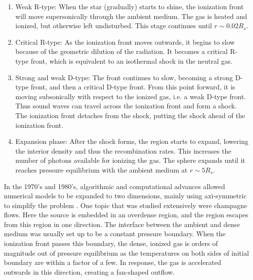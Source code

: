 \documentclass[useAMS,usenatbib]{mn2e}
\begin{document}
\begin{enumerate}
\item Weak R-type:  When the star (gradually) starts to shine, the
  ionization front will move supersonically through the ambient
  medium.  The gas is heated and ionized, but otherwise left
  undisturbed.  This stage continues until $r \sim 0.02R_s$.
\item Critical R-type:  As the ionization front moves outwards, it
  begins to slow because of the geometric dilution of the radiation.
  It becomes a critical R-type front, which is equivalent to an
  isothermal shock in the neutral gas.
\item Strong and weak D-type:  The front continues to slow, becoming a
  strong D-type front, and then a critical D-type front.  From this
  point forward, it is moving subsonically with respect to the ionized
  gas, i.e. a weak D-type front.  Thus sound waves can travel across
  the ionization front and form a shock.  The ionization front
  detaches from the shock, putting the shock ahead of the ionization
  front.
\item Expansion phase:  After the shock forms, the \hii region
  starts to expand, lowering the interior density and thus the
  recombination rates.  This increases the number of photons available
  for ionizing the gas.  The sphere expands until it reaches pressure
  equilibrium with the ambient medium at $r \sim 5R_s$.
\end{enumerate}
%

In the 1970's and 1980's, algorithmic and computational advances
allowed numerical models to be expanded to two dimensions, mainly
using axi-symmetric to simplify the problem
\citep[e.g.][]{Bodenheimer79, Sandford82, Yorke83}.  One topic that was
studied extensively were champagne flows.  Here the source is embedded
in an overdense region, and the \hii region escapes from this
region in one direction.  The interface between the ambient and dense
medium was usually set up to be a constant pressure boundary.  When
the ionization front passes this boundary, the dense, ionized gas is
orders of magnitude out of pressure equilibrium as the temperatures on
both sides of initial boundary are within a factor of a few.  In
response, the gas is accelerated outwards in this direction, creating
a fan-shaped outflow.
\end{document}
